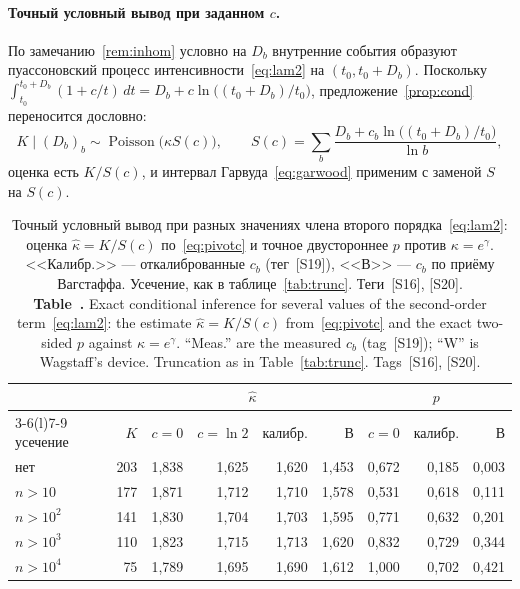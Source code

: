 \documentclass[11pt,a4paper]{article}
\newcommand{\encaptab}[1]{\\[3pt]\foreignlanguage{english}{%
  \textbf{Table~\thetable.} #1}}
\theoremstyle{plain}
\theoremstyle{remark}
\newcommand{\eg}{e^{\gamma}}
\DeclareMathOperator{\Pois}{Poisson}
\begin{document}
\paragraph{Точный условный вывод при заданном $c$.} По
замечанию~\ref{rem:inhom} условно на $D_b$ внутренние события образуют
пуассоновский процесс интенсивности~\eqref{eq:lam2} на $(t_0,t_0+D_b)$. Поскольку
$\int_{t_0}^{t_0+D_b}(1+c/t)\,dt=D_b+c\ln\bigl((t_0+D_b)/t_0\bigr)$,
предложение~\ref{prop:cond} переносится дословно:
\begin{equation}\label{eq:pivotc}
K\mid(D_b)_b\sim\Pois\bigl(\kappa S(c)\bigr),\qquad
S(c)=\sum_b\frac{D_b+c_b\ln\bigl((t_0+D_b)/t_0\bigr)}{\ln b},
\end{equation}
оценка есть $K/S(c)$, и интервал Гарвуда~\eqref{eq:garwood} применим с заменой $S$
на $S(c)$.

\begin{table}[t]
\centering
\caption{Точный условный вывод при разных значениях члена второго
порядка~\eqref{eq:lam2}: оценка $\hat\kappa=K/S(c)$ по~\eqref{eq:pivotc} и точное
двустороннее $p$ против $\kappa=\eg$. <<Калибр.>> --- откалиброванные $c_b$ (тег~[S19]),
<<В>> --- $c_b$ по приёму Вагстаффа. Усечение, как в таблице~\ref{tab:trunc}.
Теги~[S16], [S20].
\encaptab{Exact conditional inference for several values of the second-order
term~\eqref{eq:lam2}: the estimate $\hat\kappa=K/S(c)$ from~\eqref{eq:pivotc} and the
exact two-sided $p$ against $\kappa=\eg$. ``Meas.'' are the measured $c_b$
(tag~[S19]); ``W'' is Wagstaff's device. Truncation as in Table~\ref{tab:trunc}.
Tags~[S16], [S20].}}
\label{tab:second}
\small
\setlength{\tabcolsep}{4pt}
\begin{tabular}{lrrrrrrrr}
\toprule
& & \multicolumn{4}{c}{$\hat\kappa$} & \multicolumn{3}{c}{$p$}\\
\cmidrule(lr){3-6}\cmidrule(l){7-9}
усечение & $K$ & $c{=}0$ & $c{=}\ln2$ & калибр. & В & $c{=}0$ & калибр. & В\\
\midrule
нет & 203 & 1{,}838 & 1{,}625 & 1{,}620 & 1{,}453 & 0{,}672 & 0{,}185 & 0{,}003\\
$n>10$ & 177 & 1{,}871 & 1{,}712 & 1{,}710 & 1{,}578 & 0{,}531 & 0{,}618 & 0{,}111\\
$n>10^2$ & 141 & 1{,}830 & 1{,}704 & 1{,}703 & 1{,}595 & 0{,}771 & 0{,}632 & 0{,}201\\
$n>10^3$ & 110 & 1{,}823 & 1{,}715 & 1{,}713 & 1{,}620 & 0{,}832 & 0{,}729 & 0{,}344\\
$n>10^4$ & 75 & 1{,}789 & 1{,}695 & 1{,}690 & 1{,}612 & 1{,}000 & 0{,}702 & 0{,}421\\
\bottomrule
\end{tabular}
\end{table}
\end{document}
